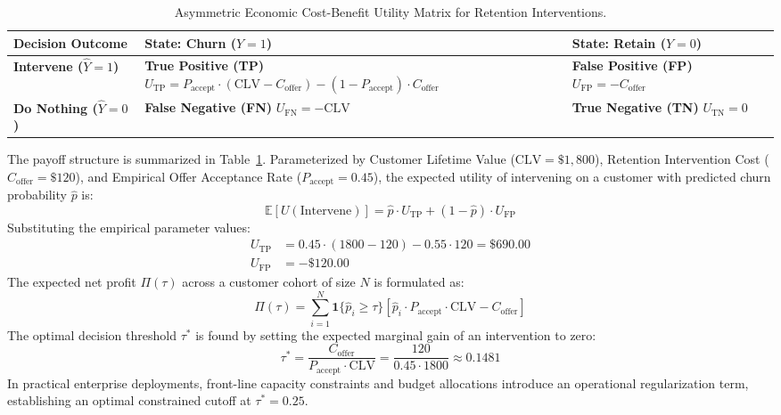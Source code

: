 \documentclass[journal,compsoc]{IEEEtran}
\begin{document}
\begin{table}[!t]
\centering
\caption{Asymmetric Economic Cost-Benefit Utility Matrix for Retention Interventions.}
\label{tab:payoff}
\begin{tabularx}{\columnwidth}{lXX}
\toprule
\textbf{Decision Outcome} & \textbf{State: Churn ($Y=1$)} & \textbf{State: Retain ($Y=0$)} \\
\midrule
\textbf{Intervene ($\hat{Y}=1$)} & \textbf{True Positive (TP)} \newline $U_{\text{TP}} = P_{\text{accept}} \cdot (\text{CLV} - C_{\text{offer}}) - (1 - P_{\text{accept}}) \cdot C_{\text{offer}}$ & \textbf{False Positive (FP)} \newline $U_{\text{FP}} = -C_{\text{offer}}$ \\
\addlinespace
\textbf{Do Nothing ($\hat{Y}=0$)} & \textbf{False Negative (FN)} \newline $U_{\text{FN}} = -\text{CLV}$ & \textbf{True Negative (TN)} \newline $U_{\text{TN}} = 0$ \\
\bottomrule
\end{tabularx}
\end{table}

The payoff structure is summarized in Table~\ref{tab:payoff}. Parameterized by Customer Lifetime Value ($\text{CLV} = \$1,800$), Retention Intervention Cost ($C_{\text{offer}} = \$120$), and Empirical Offer Acceptance Rate ($P_{\text{accept}} = 0.45$), the expected utility of intervening on a customer with predicted churn probability $\hat{p}$ is:
\begin{equation}
\mathbb{E}[U(\text{Intervene})] = \hat{p} \cdot U_{\text{TP}} + (1 - \hat{p}) \cdot U_{\text{FP}}
\end{equation}
Substituting the empirical parameter values:
\begin{align}
U_{\text{TP}} &= 0.45 \cdot (1800 - 120) - 0.55 \cdot 120 = \$690.00 \\
U_{\text{FP}} &= -\$120.00
\end{align}
The expected net profit $\Pi(\tau)$ across a customer cohort of size $N$ is formulated as:
\begin{equation}
\Pi(\tau) = \sum_{i=1}^N \mathbf{1}\{\hat{p}_i \ge \tau\} \left[ \hat{p}_i \cdot P_{\text{accept}} \cdot \text{CLV} - C_{\text{offer}} \right]
\label{eq:profit}
\end{equation}
The optimal decision threshold $\tau^*$ is found by setting the expected marginal gain of an intervention to zero:
\begin{equation}
\tau^* = \frac{C_{\text{offer}}}{P_{\text{accept}} \cdot \text{CLV}} = \frac{120}{0.45 \cdot 1800} \approx 0.1481
\label{eq:optimal_tau}
\end{equation}
In practical enterprise deployments, front-line capacity constraints and budget allocations introduce an operational regularization term, establishing an optimal constrained cutoff at $\tau^* = 0.25$.
\end{document}
